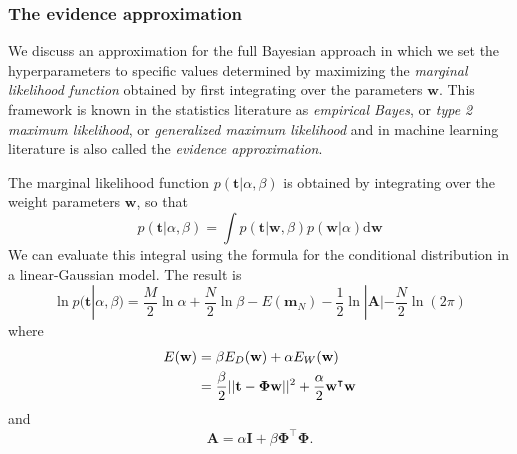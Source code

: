 \documentclass[a4paper]{report}
\newcommand{\ud}{\mathrm{d}}
\renewcommand{\bf}{\mathbf}
\newcommand{\imp}[1]{{\color{blue}\textit{#1}}}
\newcommand{\bs}{\boldsymbol}
\begin{document}
\subsubsection{The evidence approximation}
We discuss an approximation for the full Bayesian approach in which we set the hyperparameters to specific values determined by maximizing the \imp{marginal likelihood function} obtained by first integrating over the parameters $\bf{w}$. This framework is known in the statistics literature as \imp{empirical Bayes}, or \imp{type 2 maximum likelihood}, or \imp{generalized maximum likelihood} and in machine learning literature is also called the \imp{evidence approximation}.

The marginal likelihood function $p(\bf{t}|\alpha,\beta)$ is obtained by integrating over the weight parameters $\bf{w}$, so that
\begin{equation}
	p(\bf{t}|\alpha,\beta) = \int p(\bf{t}|\bf{w},\beta) p(\bf{w}|\alpha) \ud \bf{w}
\end{equation}
We can evaluate this integral using the formula for the conditional distribution in a linear-Gaussian model. The result is
\begin{equation}
	\ln p(\bf{t}|\alpha,\beta) = \frac{M}{2} \ln \alpha + \frac{N}{2} \ln \beta - E(\bf{m}_N)-\frac{1}{2}\ln |\bf{A}| - \frac{N}{2}\ln(2 \pi)
\end{equation}
where
\begin{align}
	E(\bf{w}) &= \beta 	E_D(\bf{w}) + \alpha E_W(\bf{w}) \notag \\
	&= \frac{\beta}{2} ||\bf{t}-\bs{\Phi}\bf{w}||^2 + \frac{\alpha}{2} \bf{w}^{\intercal} \bf{w}
\end{align}
and
\begin{equation}
	\bf{A} = \alpha \bf{I} + \beta \bf{\Phi}^{\intercal} \bf{\Phi}.
\end{equation}
\end{document}
